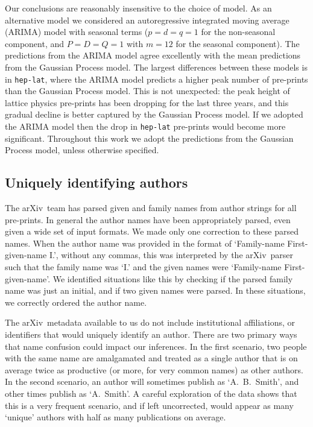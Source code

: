 \documentclass[a4paper,12pt]{article}
\newcommand{\arxiv}{arXiv}
\begin{document}
Our conclusions are reasonably insensitive to the choice of model. As an alternative model we considered an autoregressive integrated moving average (ARIMA) model\cite{BoxJenkins:1970} with seasonal terms ($p=d=q=1$ for the non-seasonal component, and $P=D=Q=1$ with $m=12$ for the seasonal component). The predictions from the ARIMA model agree excellently with the mean predictions from the Gaussian Process model. The largest differences between these models is in \texttt{hep-lat}, where the ARIMA model predicts a higher peak number of pre-prints than the Gaussian Process model. This is not unexpected: the peak height of lattice physics pre-prints has been dropping for the last three years, and this gradual decline is better captured by the Gaussian Process model. If we adopted the ARIMA model then the drop in \texttt{hep-lat} pre-prints would become more significant. Throughout this work we adopt the predictions from the Gaussian Process model, unless otherwise specified.



\subsection*{Uniquely identifying authors}

The \arxiv\ team has parsed given and family names from author strings for all pre-prints. In general the author names have been appropriately parsed, even given a wide set of input formats. We made only one correction to these parsed names. When the author name was provided in the format of `Family-name First-given-name I.', without any commas, this was interpreted by the \arxiv\ parser such that the family name was `I.' and the given names were `Family-name First-given-name'. We identified situations like this by checking if the parsed family name was just an initial, and if two given names were parsed. In these situations, we correctly ordered the author name.

The \arxiv\ metadata available to us do not include institutional affiliations, or identifiers that would uniquely identify an author. 
There are two primary ways that name confusion could impact our inferences. In the first scenario, two people with the same name are amalgamated and treated as a single author that is on average twice as productive (or more, for very common names) as other authors. In the second scenario, an author will sometimes publish as `A.~B.~Smith', and other times publish as `A.~Smith'. A careful exploration of the data shows that this is a very frequent scenario, and if left uncorrected, would appear as many `unique' authors with half as many publications on average.
\end{document}
